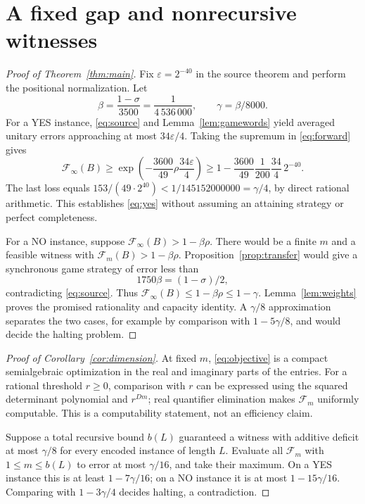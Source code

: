 \documentclass[11pt,a4paper]{article}
\newcommand{\F}{\mathcal F}
\begin{document}
\section{A fixed gap and nonrecursive witnesses}
\begin{proof}[Proof of Theorem~\ref{thm:main}]
Fix $\varepsilon=2^{-40}$ in the source theorem and perform the positional normalization. Let
\[
 \beta=\frac{1-\sigma}{3500}=\frac1{4\,536\,000},
 \qquad \gamma=\beta/8000.
\]
For a YES instance, \eqref{eq:source} and Lemma~\ref{lem:gamewords} yield averaged unitary errors approaching at most $34\varepsilon/4$. Taking the supremum in \eqref{eq:forward} gives
\[
 \F_\infty(B)\ge
 \exp\left(-\frac{3600}{49}\rho\frac{34\varepsilon}{4}\right)
 \ge 1-\frac{3600}{49}\frac1{200}\frac{34}{4}\,2^{-40}.
\]
The last loss equals $153/(49\cdot2^{40})<1/145152000000=\gamma/4$, by direct rational arithmetic. This establishes \eqref{eq:yes} without assuming an attaining strategy or perfect completeness.

For a NO instance, suppose $\F_\infty(B)>1-\beta\rho$. There would be a finite $m$ and a feasible witness with $\F_m(B)>1-\beta\rho$. Proposition~\ref{prop:transfer} would give a synchronous game strategy of error less than
\[
 1750\beta=(1-\sigma)/2,
\]
contradicting \eqref{eq:source}. Thus $\F_\infty(B)\le1-\beta\rho\le1-\gamma$. Lemma~\ref{lem:weights} proves the promised rationality and capacity identity. A $\gamma/8$ approximation separates the two cases, for example by comparison with $1-5\gamma/8$, and would decide the halting problem.
\end{proof}

\begin{proof}[Proof of Corollary~\ref{cor:dimension}]
At fixed $m$, \eqref{eq:objective} is a compact semialgebraic optimization in the real and imaginary parts of the entries. For a rational threshold $r\ge0$, comparison with $r$ can be expressed using the squared determinant polynomial and $r^{Dm}$; real quantifier elimination makes $\F_m$ uniformly computable. This is a computability statement, not an efficiency claim.

Suppose a total recursive bound $b(L)$ guaranteed a witness with additive deficit at most $\gamma/8$ for every encoded instance of length $L$. Evaluate all $\F_m$ with $1\le m\le b(L)$ to error at most $\gamma/16$, and take their maximum. On a YES instance this is at least $1-7\gamma/16$; on a NO instance it is at most $1-15\gamma/16$. Comparing with $1-3\gamma/4$ decides halting, a contradiction.
\end{proof}
\end{document}

